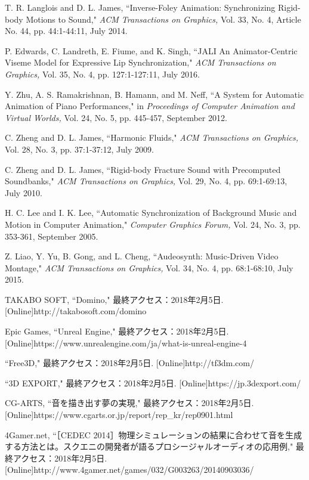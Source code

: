 \renewcommand{\refname}{参考文献}	
%
\begin{thebibliography}{55}
%
T. R. Langlois and D. L. James,
 ``Inverse-Foley Animation: Synchronizing Rigid-body Motions to Sound,"
  \textit{ACM Transactions on Graphics,} Vol. 33, No. 4, Article No. 44, pp. 44:1-44:11, July 2014.

P. Edwards, C. Landreth, E. Fiume, and K. Singh,
 ``JALI An Animator-Centric Viseme Model for Expressive Lip Synchronization,"
  \textit{ACM Transactions on Graphics,} Vol. 35, No. 4, pp. 127:1-127:11, July 2016.

Y. Zhu, A. S. Ramakrishnan, B. Hamann, and M. Neff,
 ``A System for Automatic Animation of Piano Performances,"
  in \textit{Proceedings of Computer Animation and Virtual Worlds,} Vol. 24, No. 5, pp. 445-457, September 2012.

C. Zheng and D. L. James,
 ``Harmonic Fluids,"
 \textit{ACM Transactions on Graphics,} Vol. 28, No. 3, pp. 37:1-37:12, July 2009.

C. Zheng and D. L. James,
 ``Rigid-body Fracture Sound with Precomputed Soundbanks,"
 \textit{ACM Transactions on Graphics,} Vol. 29, No. 4, pp. 69:1-69:13, July 2010.

H. C. Lee and I. K. Lee,
 ``Automatic Synchronization of Background Music and Motion in Computer Animation,"
 \textit{Computer Graphics Forum,} Vol. 24, No. 3, pp. 353-361, September 2005.

Z. Liao, Y. Yu, B. Gong, and L. Cheng,
 ``Audeosynth: Music-Driven Video Montage,"
 \textit{ACM Transactions on Graphics,} Vol. 34, No. 4, pp. 68:1-68:10, July 2015.

TAKABO SOFT, ``Domino," 最終アクセス：2018年2月5日.
 [Online]http://takabosoft.com/domino

Epic Games, ``Unreal Engine," 最終アクセス：2018年2月5日.
 [Online]https://www.unrealengine.com/ja/what-is-unreal-engine-4

``Free3D," 最終アクセス：2018年2月5日.
[Online]http://tf3dm.com/

``3D EXPORT," 最終アクセス：2018年2月5日.
[Online]https://jp.3dexport.com/

CG-ARTS, ``音を描き出す夢の実現," 最終アクセス：2018年2月5日.
 [Online]https://www.cgarts.or.jp/report/rep\_kr/rep0901.html

4Gamer.net,
 ``［CEDEC 2014］物理シミュレーションの結果に合わせて音を生成する方法とは。スクエニの開発者が語るプロシージャルオーディオの応用例," 最終アクセス：2018年2月5日.
 [Online]http://www.4gamer.net/games/032/G003263/20140903036/
 

\end{thebibliography}
